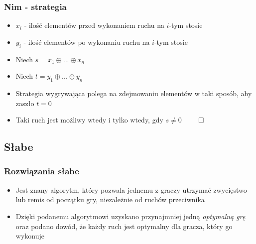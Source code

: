 \documentclass[polish,envcountsect,10pt]{beamer}
\begin{document}
                \begin{frame}
                    \frametitle{Nim - strategia}
                    \begin{itemize}
                        \item<1-> $x_i$ - ilość elementów przed wykonaniem ruchu na $i$-tym stosie
                        \item<1-> $y_i$ - ilość elementów po wykonaniu ruchu na $i$-tym stosie
                        \item<1-> Niech $s = x_1 \oplus ... \oplus x_n$
                        \item<1-> Niech $t = y_1 \oplus ... \oplus y_n$
                        \item<2-> Strategia wygrywająca polega na zdejmowaniu elementów w taki sposób, aby zaszło $t = 0$
                        \item<3-> Taki ruch jest możliwy wtedy i tylko wtedy, gdy $s \neq 0$ \pause $\qed$
                    \end{itemize}
                \end{frame}
            \subsection{Słabe}
            \begin{frame}
                \frametitle{Rozwiązania słabe}
                \begin{itemize}
                    \item<1-> Jest znany algorytm, który pozwala jednemu z graczy utrzymać zwycięstwo lub remis od początku gry, niezależnie od ruchów przeciwnika
                    \item<2-> Dzięki podanemu algorytmowi uzyskano przynajmniej jedną \textit{optymalną grę} oraz podano dowód, że każdy ruch jest optymalny dla gracza, który go wykonuje                    
                \end{itemize}     
            \end{frame}
\end{document}
